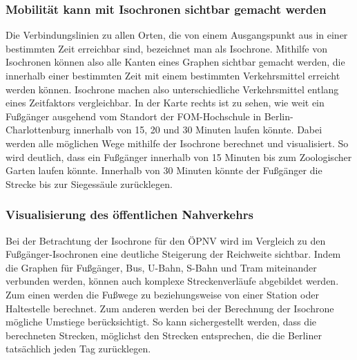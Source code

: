\subsubsection{Mobilität kann mit Isochronen sichtbar gemacht werden}
Die Verbindungslinien zu allen Orten, die von einem Ausgangspunkt aus in einer bestimmten Zeit erreichbar sind, bezeichnet man als Isochrone. Mithilfe von Isochronen können also alle Kanten eines Graphen sichtbar gemacht werden, die innerhalb einer bestimmten Zeit mit einem bestimmten Verkehrsmittel erreicht werden können. Isochrone machen also unterschiedliche Verkehrsmittel entlang eines Zeitfaktors vergleichbar. In der Karte rechts ist zu sehen, wie weit ein Fußgänger ausgehend vom Standort der FOM-Hochschule in Berlin-Charlottenburg innerhalb von 15, 20 und 30 Minuten laufen könnte. Dabei werden alle möglichen Wege mithilfe der Isochrone berechnet und visualisiert. So wird deutlich, dass ein Fußgänger innerhalb von 15 Minuten bis zum Zoologischer Garten laufen könnte. Innerhalb von 30 Minuten könnte der Fußgänger die Strecke bis zur Siegessäule zurücklegen.

\subsubsection{Visualisierung des öffentlichen Nahverkehrs}
Bei der Betrachtung der Isochrone für den ÖPNV wird im Vergleich zu den Fußgänger-Isochronen eine deutliche Steigerung der Reichweite sichtbar. Indem die Graphen für Fußgänger, Bus, U-Bahn, S-Bahn und Tram miteinander verbunden werden, können auch komplexe Streckenverläufe abgebildet werden. Zum einen werden die Fußwege zu beziehungsweise von einer Station oder Haltestelle berechnet. Zum anderen werden bei der Berechnung der Isochrone mögliche Umstiege berücksichtigt. So kann sichergestellt werden, dass die berechneten Strecken, möglichst den Strecken entsprechen, die die Berliner tatsächlich jeden Tag zurücklegen.
